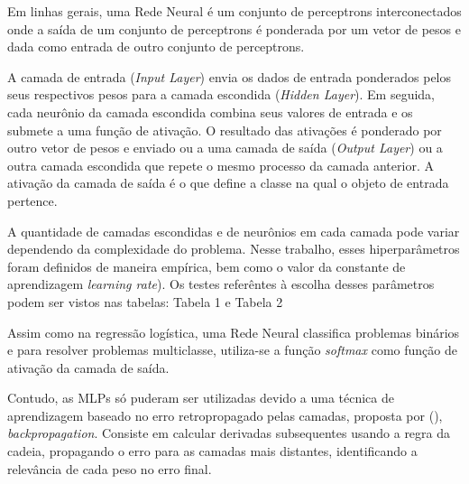 \documentclass[conference]{IEEEtran}
\begin{document}
  Em linhas gerais, uma Rede Neural é um conjunto de perceptrons interconectados onde a saída de um conjunto de perceptrons é ponderada por um vetor de pesos e dada como entrada de outro conjunto de perceptrons. 
  
  A camada de entrada (\textit{Input Layer}) envia os dados de entrada ponderados pelos seus respectivos pesos para a camada escondida (\textit{Hidden Layer}). Em seguida, cada neurônio da camada escondida combina seus valores de entrada e os submete a uma função de ativação. O resultado das ativações é ponderado por outro vetor de pesos e enviado ou a uma camada de saída (\textit{Output Layer}) ou a outra camada escondida que repete o mesmo processo da camada anterior. A ativação da camada de saída é o que define a classe na qual o objeto de entrada pertence. 
  
  A quantidade de camadas escondidas e de neurônios em cada camada pode variar dependendo da complexidade do problema. Nesse trabalho, esses hiperparâmetros foram definidos de maneira empírica, bem como o valor da constante de aprendizagem \textit{learning rate}). Os testes referêntes à escolha desses parâmetros podem ser vistos nas tabelas: Tabela 1 e Tabela 2
  
  Assim como na regressão logística, uma Rede Neural classifica problemas binários e para resolver problemas multiclasse, utiliza-se a função \textit{softmax} como função de ativação da camada de saída.
  
  Contudo, as MLPs só puderam ser utilizadas devido a uma técnica de aprendizagem baseado no erro retropropagado pelas camadas, proposta por \citeauthor{rumelhart1986learning} (\citeyear{rumelhart1986learning}), \textit{backpropagation}. Consiste em calcular derivadas subsequentes usando a regra da cadeia, propagando o erro para as camadas mais distantes, identificando a relevância de cada peso no erro final.
  
  
	 
\end{document}
